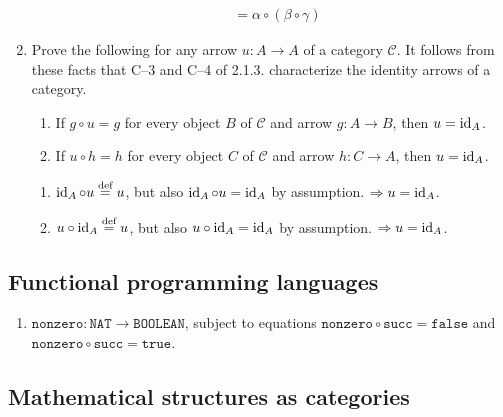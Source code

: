 \begin{enumerate}
\begin{solution}
\begin{align*}
                   & = \alpha \circ (\beta \circ \gamma)
              \end{align*}
          \end{solution}
    \item Prove the following for any arrow \(u : A \to A\) of a category \(\mathcal{C}\). It follows from these facts that C--3 and C--4 of 2.1.3. characterize the identity arrows of a category.
          \begin{enumerate}
              \item If \(g \circ u = g\) for every object \(B\) of \(\mathcal{C}\) and arrow \(g : A \to B\), then \(u = \operatorname{id}_A\).
              \item If \(u \circ h = h\) for every object \(C\) of \(\mathcal{C}\) and arrow \(h : C \to A\), then \(u = \operatorname{id}_A\).
          \end{enumerate}
          \begin{solution}\itemfix
              \begin{enumerate}
                  \item \(\operatorname{id}_A \circ u \stackrel{\text{def}}{=} u\), but also \(\operatorname{id}_A \circ u = \operatorname{id}_A\) by assumption. \(\Rightarrow u = \operatorname{id}_A\).
                  \item \(u \circ \operatorname{id}_A \stackrel{\text{def}}{=} u\), but also \(u \circ \operatorname{id}_A = \operatorname{id}_A\) by assumption. \(\Rightarrow u = \operatorname{id}_A\).
              \end{enumerate}
          \end{solution}
\end{enumerate}

\subsection{Functional programming languages}

\begin{enumerate}
    \item \(\texttt{nonzero}: \texttt{NAT} \to \texttt{BOOLEAN}\), subject to equations \(\texttt{nonzero} \circ \texttt{succ} = \texttt{false}\) and \(\texttt{nonzero} \circ \texttt{succ} = \texttt{true}\).
\end{enumerate}

\subsection{Mathematical structures as categories}

